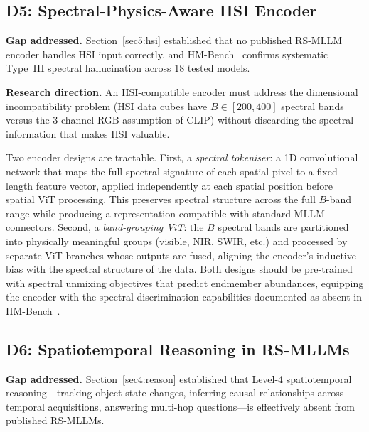 \subsection{D5: Spectral-Physics-Aware HSI Encoder}\label{sec9:d5}

\textbf{Gap addressed.} Section~\ref{sec5:hsi} established that no
published RS-MLLM encoder handles HSI input correctly, and
HM-Bench~\cite{hmbench2026} confirms systematic Type~III spectral
hallucination across 18 tested models.

\textbf{Research direction.} An HSI-compatible encoder must address the
dimensional incompatibility problem (HSI data cubes have $B\!\in\![200,400]$
spectral bands versus the 3-channel RGB assumption of CLIP) without
discarding the spectral information that makes HSI valuable.

Two encoder designs are tractable. First, a \emph{spectral tokeniser}:
a 1D convolutional network that maps the full spectral signature of each
spatial pixel to a fixed-length feature vector, applied independently
at each spatial position before spatial ViT processing. This preserves
spectral structure across the full $B$-band range while producing a
representation compatible with standard MLLM connectors. Second, a
\emph{band-grouping ViT}: the $B$ spectral bands are partitioned into
physically meaningful groups (visible, NIR, SWIR, etc.) and processed
by separate ViT branches whose outputs are fused, aligning the encoder's
inductive bias with the spectral structure of the data. Both designs
should be pre-trained with spectral unmixing objectives that predict
endmember abundances, equipping the encoder with the spectral
discrimination capabilities documented as absent in
HM-Bench~\cite{hmbench2026}.

\subsection{D6: Spatiotemporal Reasoning in RS-MLLMs}\label{sec9:d6}

\textbf{Gap addressed.} Section~\ref{sec4:reason} established that
Level-4 spatiotemporal reasoning---tracking object state changes,
inferring causal relationships across temporal acquisitions, answering
multi-hop questions---is effectively absent from published RS-MLLMs.

